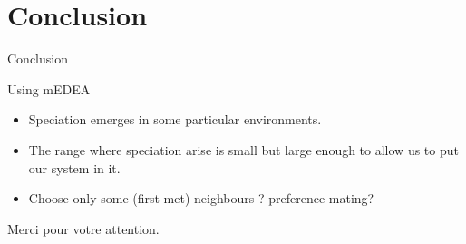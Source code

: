 \documentclass[8pt, handout=show,notes=show]{beamer}
\begin{document}
\section{Conclusion}

\begin{frame}{Conclusion}
	\begin{block}{Using mEDEA}
		\begin{itemize}
			\item Speciation emerges in some particular environments.
			\item The range where speciation arise is small but large enough to allow us to put our system in it.
			\item Choose only some (first met) neighbours ? preference mating? 
		\end{itemize}
	\end{block}
\end{frame}

\begin{frame}%
	\begin{center}
		Merci pour votre attention.
	\end{center}
\end{frame}
\end{document}
